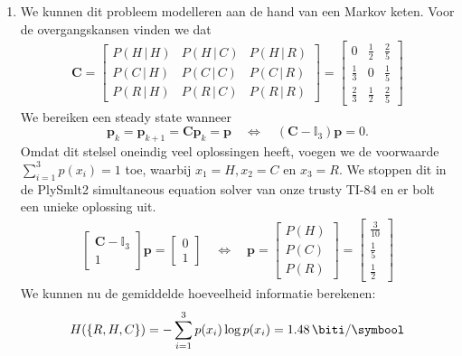 \documentclass[kulak]{kulakarticle}
\begin{document}
	\begin{enumerate}

		\item We kunnen dit probleem modelleren aan de hand van een Markov keten. Voor de overgangskansen vinden we dat \begin{align*}
			\mathbf{C} = \begin{bmatrix}
				P(H\, | \,H) & P(H\, | \,C) & P(H\, | \,R) \\
				P(C\, | \,H) & P(C\, | \,C) & P(C\, | \,R) \\
				P(R\, | \,H) & P(R\, | \,C) & P(R\, | \,R)
			\end{bmatrix} = \begin{bmatrix}
				0 			& \frac{1}{2} 	& \frac{2}{5} \\
				\frac{1}{3} & 0 			& \frac{1}{5} \\
				\frac{2}{3} & \frac{1}{2}	& \frac{2}{5}
			\end{bmatrix}
		\end{align*}We bereiken een steady state wanneer \[\mathbf{p}_k = \mathbf{p}_{k+1} = \mathbf{C}\mathbf{p}_k = \mathbf{p} \quad \Longleftrightarrow \quad (\mathbf{C}-\mathbb{I}_3)\mathbf{p}=0.\] Omdat dit stelsel oneindig veel oplossingen heeft, voegen we de voorwaarde \(\sum_{i=1}^{3} p(x_i) = 1\) toe, waarbij \(x_1=H, x_2=C\) en \(x_3=R\). We stoppen dit in de PlySmlt2 simultaneous equation solver van onze trusty TI-84 en er bolt een unieke oplossing uit. \begin{align*}
			\begin{bmatrix}
				\mathbf{C} - \mathbb{I}_3 \\
				1
			\end{bmatrix}\mathbf{p} = \begin{bmatrix}
			0 \\
			1
			\end{bmatrix} \quad \Longleftrightarrow \quad \mathbf{p} = \begin{bmatrix}
			P(H)\\
			P(C)\\
			P(R)
			\end{bmatrix} = \begin{bmatrix}
			\frac{3}{10}\\
			\frac{1}{5}\\
			\frac{1}{2}
			\end{bmatrix}
		\end{align*}
		We kunnen nu de gemiddelde hoeveelheid informatie berekenen:
		\begin{align*}
			H(\{R,H,C\}) = - \sum_{i=1}^{3} p(x_i) \log p(x_i) = \SI{1.48}{\biti\per\symbool}
		\end{align*}


\end{enumerate}
\end{document}
